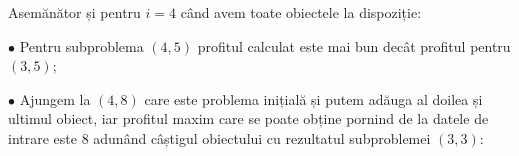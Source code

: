 \begin{sloppypar}

Asemănător și pentru $i = 4$ când avem toate obiectele la dispoziție: \par
$\bullet$ Pentru subproblema $(4, 5)$ profitul calculat este mai bun decât profitul pentru $(3, 5)$; \par
$\bullet$ Ajungem la $(4, 8)$ care este problema inițială și putem adăuga al doilea și ultimul obiect, iar profitul maxim care se poate obține pornind de la datele de intrare este 8 adunând câștigul obiectului cu rezultatul subproblemei $(3, 3)$:


\par


\end{sloppypar}
